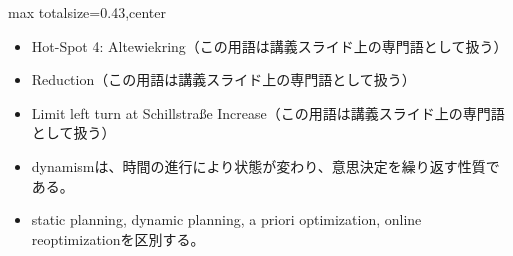 \clearpage
{}
\begin{minipage}[t]{0.405\textwidth}
\begin{adjustbox}{max totalsize={\textwidth}{0.43\textheight},center}
\begin{minipage}{\textwidth}\scriptsize
{}\begin{itemize}
\item Hot-Spot 4: Altewiekring（この用語は講義スライド上の専門語として扱う）
\item Reduction（この用語は講義スライド上の専門語として扱う）
\item Limit left turn at Schillstraße Increase（この用語は講義スライド上の専門語として扱う）
\end{itemize}\begin{itemize}
\item dynamismは、時間の進行により状態が変わり、意思決定を繰り返す性質である。
\item static planning, dynamic planning, a priori optimization, online reoptimizationを区別する。
\end{itemize}
\end{minipage}
\end{adjustbox}
\end{minipage}\hfill
